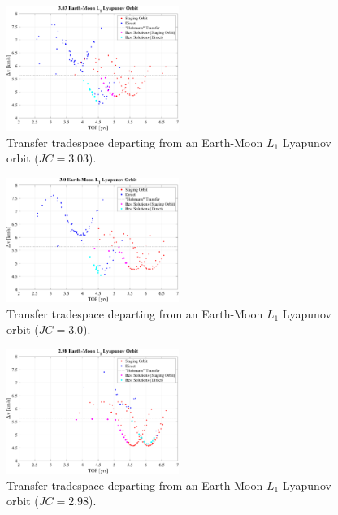 \begin{figure}[ht]
    \centering
    \includegraphics[width=0.5\textwidth]{figures/TradeSpace_L1Lyapunov_3_03.pdf}
    \caption{Transfer tradespace departing from an Earth-Moon $L_{1}$ Lyapunov orbit ($JC=3.03$).}
\end{figure}
\clearpage

\begin{figure}[ht]
    \centering
    \includegraphics[width=0.5\textwidth]{figures/TradeSpace_L1Lyapunov_3_00.pdf}
    \caption{Transfer tradespace departing from an Earth-Moon $L_{1}$ Lyapunov orbit ($JC=3.0$).}
\end{figure}

\begin{figure}[ht]
    \centering
    \includegraphics[width=0.5\textwidth]{figures/TradeSpace_L1Lyapunov_2_98.pdf}
    \caption{Transfer tradespace departing from an Earth-Moon $L_{1}$ Lyapunov orbit ($JC=2.98$).}
\end{figure}
\clearpage

